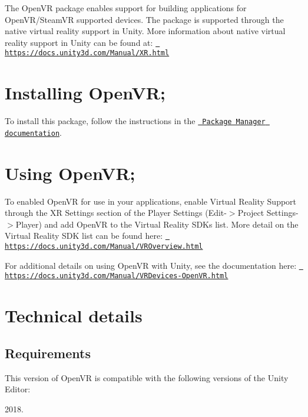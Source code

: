The Open\+VR package enables support for building applications for Open\+V\+R/\+Steam\+VR supported devices. The package is supported through the native virtual reality support in Unity. More information about native virtual reality support in Unity can be found at\+: \href{https://docs.unity3d.com/Manual/XR.html}{\texttt{ https\+://docs.\+unity3d.\+com/\+Manual/\+X\+R.\+html}}

\section*{Installing Open\+VR;}

To install this package, follow the instructions in the \href{https://docs.unity3d.com/Packages/com.unity.package-manager-ui@latest/index.html}{\texttt{ Package Manager documentation}}.

\section*{Using Open\+VR;}

To enabled Open\+VR for use in your applications, enable Virtual Reality Support through the XR Settings section of the Player Settings (Edit-\/$>$Project Settings-\/$>$Player) and add Open\+VR to the Virtual Reality S\+D\+Ks list. More detail on the Virtual Reality S\+DK list can be found here\+: \href{https://docs.unity3d.com/Manual/VROverview.html}{\texttt{ https\+://docs.\+unity3d.\+com/\+Manual/\+V\+R\+Overview.\+html}}

For additional details on using Open\+VR with Unity, see the documentation here\+: \href{https://docs.unity3d.com/Manual/VRDevices-OpenVR.html}{\texttt{ https\+://docs.\+unity3d.\+com/\+Manual/\+V\+R\+Devices-\/\+Open\+V\+R.\+html}}

\section*{Technical details}

\subsection*{Requirements}

This version of Open\+VR is compatible with the following versions of the Unity Editor\+:
\begin{DoxyItemize}
\item 2018.
\end{DoxyItemize}


